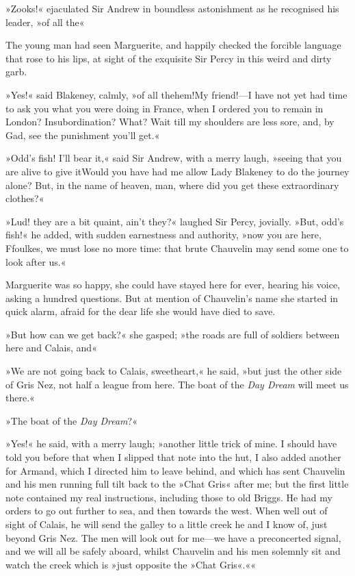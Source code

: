 »Zooks!« ejaculated Sir Andrew in boundless astonishment as he recognised his leader, »of all the\textellipsis«

The young man had seen Marguerite, and happily checked the forcible language that rose to his lips, at sight of the exquisite Sir Percy in this weird and dirty garb.

»Yes!« said Blakeney, calmly, »of all the\textellipsis \allowbreak  hem!\textellipsis \allowbreak  My friend!—I have not yet had time to ask you what you were doing in France, when I ordered you to remain in London? Insubordination? What? Wait till my shoulders are less sore, and, by Gad, see the punishment you'll get.«

»Odd's fish! I'll bear it,« said Sir Andrew, with a merry laugh, »seeing that you are alive to give it\textellipsis \allowbreak  Would you have had me allow Lady Blakeney to do the journey alone? But, in the name of heaven, man, where did you get these extraordinary clothes?«

»Lud! they are a bit quaint, ain't they?« laughed Sir Percy, jovially. »But, odd's fish!« he added, with sudden earnestness and authority, »now you are here, Ffoulkes, we must lose no more time: that brute Chauvelin may send some one to look after us.«

Marguerite was so happy, she could have stayed here for ever, hearing his voice, asking a hundred questions. But at mention of Chauvelin's name she started in quick alarm, afraid for the dear life she would have died to save.

»But how can we get back?« she gasped; »the roads are full of soldiers between here and Calais, and\textellipsis«

»We are not going back to Calais, sweetheart,« he said, »but just the other side of Gris Nez, not half a league from here. The boat of the \textit{Day Dream} will meet us there.«

»The boat of the \textit{Day Dream}?«

»Yes!« he said, with a merry laugh; »another little trick of mine. I should have told you before that when I slipped that note into the hut, I also added another for Armand, which I directed him to leave behind, and which has sent Chauvelin and his men running full tilt back to the »Chat Gris« after me; but the first little note contained my real instructions, including those to old Briggs. He had my orders to go out further to sea, and then towards the west. When well out of sight of Calais, he will send the galley to a little creek he and I know of, just beyond Gris Nez. The men will look out for me—we have a preconcerted signal, and we will all be safely aboard, whilst Chauvelin and his men solemnly sit and watch the creek which is »just opposite the »Chat Gris«.««

